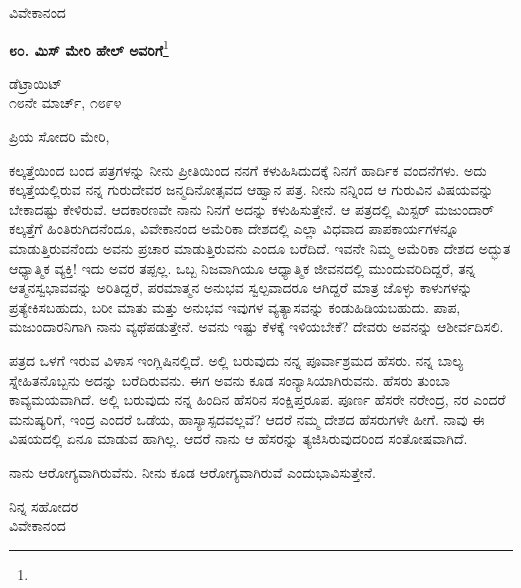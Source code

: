 \vspace{-0.5cm}

{\flushright
ವಿವೇಕಾನಂದ\par}

\begin{center}
\textbf{೮೦. ಮಿಸ್ ಮೇರಿ ಹೇಲ್‌ ಅವರಿಗೆ}\footnote{}
\end{center}

\vspace{-0.5cm}

\begin{flushright}
ಡೆಟ್ರಾಯಿಟ್\\೧೮ನೇ ಮಾರ್ಚ್, ೧೮೯೪
\end{flushright}

\vspace{-0.5cm}

\noindent
ಪ್ರಿಯ ಸೋದರಿ ಮೇರಿ,

ಕಲ್ಕತ್ತೆಯಿಂದ ಬಂದ ಪತ್ರಗಳನ್ನು ನೀನು ಪ್ರೀತಿಯಿಂದ ನನಗೆ ಕಳುಹಿಸಿದುದಕ್ಕೆ ನಿನಗೆ ಹಾರ್ದಿಕ ವಂದನೆಗಳು. ಅದು ಕಲ್ಕತ್ತೆಯಲ್ಲಿರುವ ನನ್ನ ಗುರುದೇವರ ಜನ್ಮದಿನೋತ್ಸವದ ಆಹ್ವಾನ ಪತ್ರ. ನೀನು ನನ್ನಿಂದ ಆ ಗುರುವಿನ ವಿಷಯವನ್ನು ಬೇಕಾದಷ್ಟು ಕೇಳಿರುವೆ. ಆದಕಾರಣವೇ ನಾನು ನಿನಗೆ ಅದನ್ನು ಕಳುಹಿಸುತ್ತೇನೆ. ಆ ಪತ್ರದಲ್ಲಿ ಮಿಸ್ಟರ್ ಮಜುಂದಾರ್ ಕಲ್ಕತ್ತೆಗೆ ಹಿಂತಿರುಗಿದನೆಂದೂ, ವಿವೇಕಾನಂದ ಅಮೆರಿಕಾ ದೇಶದಲ್ಲಿ ಎಲ್ಲಾ ವಿಧವಾದ ಪಾಪಕಾರ್ಯಗಳನ್ನೂ ಮಾಡುತ್ತಿರುವನೆಂದು ಅವನು ಪ್ರಚಾರ ಮಾಡುತ್ತಿರುವನು ಎಂದೂ ಬರೆದಿದೆ. ಇವನೇ ನಿಮ್ಮ ಅಮೆರಿಕಾ ದೇಶದ ಅದ್ಭುತ ಆಧ್ಯಾತ್ಮಿಕ ವ್ಯಕ್ತಿ! ಇದು ಅವರ ತಪ್ಪಲ್ಲ. ಒಬ್ಬ ನಿಜವಾಗಿಯೂ ಆಧ್ಯಾತ್ಮಿಕ ಜೀವನದಲ್ಲಿ ಮುಂದುವರಿದಿದ್ದರೆ, ತನ್ನ ಆತ್ಮನಸ್ವಭಾವವನ್ನು ಅರಿತಿದ್ದರೆ, ಪರಮಾತ್ಮನ ಅನುಭವ ಸ್ವಲ್ಪವಾದರೂ ಆಗಿದ್ದರೆ ಮಾತ್ರ ಜೊಳ್ಳು ಕಾಳುಗಳನ್ನು ಪ್ರತ್ಯೇಕಿಸಬಹುದು, ಬರೀ ಮಾತು ಮತ್ತು ಅನುಭವ ಇವುಗಳ ವ್ಯತ್ಯಾಸವನ್ನು ಕಂಡುಹಿಡಿಯಬಹುದು. ಪಾಪ, ಮಜುಂದಾರನಿಗಾಗಿ ನಾನು ವ್ಯಥೆಪಡುತ್ತೇನೆ. ಅವನು ಇಷ್ಟು ಕೆಳಕ್ಕೆ ಇಳಿಯಬೇಕೆ? ದೇವರು ಅವನನ್ನು ಆಶೀರ್ವದಿಸಲಿ.

ಪತ್ರದ ಒಳಗೆ ಇರುವ ವಿಳಾಸ ಇಂಗ್ಲಿಷಿನಲ್ಲಿದೆ. ಅಲ್ಲಿ ಬರುವುದು ನನ್ನ ಪೂರ್ವಾಶ್ರಮದ ಹೆಸರು. ನನ್ನ ಬಾಲ್ಯ ಸ್ನೇಹಿತನೊಬ್ಬನು ಅದನ್ನು ಬರೆದಿರುವನು. ಈಗ ಅವನು ಕೂಡ ಸಂನ್ಯಾಸಿಯಾಗಿರುವನು. ಹೆಸರು ತುಂಬಾ ಕಾವ್ಯಮಯವಾಗಿದೆ. ಅಲ್ಲಿ ಬರುವುದು ನನ್ನ ಹಿಂದಿನ ಹೆಸರಿನ ಸಂಕ್ಷಿಪ್ತರೂಪ. ಪೂರ್ಣ ಹೆಸರೇ ನರೇಂದ್ರ, ನರ ಎಂದರೆ ಮನುಷ್ಯರಿಗೆ, ಇಂದ್ರ ಎಂದರೆ ಒಡೆಯ, ಹಾಸ್ಯಾಸ್ಪದವಲ್ಲವೆ? ಆದರೆ ನಮ್ಮ ದೇಶದ ಹೆಸರುಗಳೇ ಹೀಗೆ. ನಾವು ಈ ವಿಷಯದಲ್ಲಿ ಏನೂ ಮಾಡುವ ಹಾಗಿಲ್ಲ. ಆದರೆ ನಾನು ಆ ಹೆಸರನ್ನು ತ್ಯಜಿಸಿರುವುದರಿಂದ ಸಂತೋಷವಾಗಿದೆ.

ನಾನು ಆರೋಗ್ಯವಾಗಿರುವೆನು. ನೀನು ಕೂಡ ಆರೋಗ್ಯವಾಗಿರುವೆ ಎಂದು\break ಭಾವಿಸುತ್ತೇನೆ.
\vspace{-0.6cm}

{\flushright
ನಿನ್ನ ಸಹೋದರ\\ವಿವೇಕಾನಂದ\par}
\vspace{-0.4cm}

